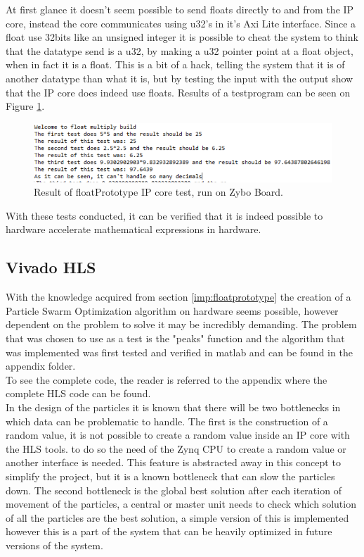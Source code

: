 At first glance it doesn't seem possible to send floats directly to and from the IP core, instead the core communicates using u32's in it's Axi Lite interface. Since a float use 32bits like an unsigned integer it is possible to cheat the system to think that the datatype send is a u32, by making a u32 pointer point at a float object, when in fact it is a float. This is a bit of a hack, telling the system that it is of another datatype than what it is, but by testing the input with the output show that the IP core does indeed use floats. Results of a testprogram can be seen on Figure \ref{fig:floatmultiply}.\\

\begin{figure}[H]
	\centering
	\includegraphics[trim={0 2 0 0},clip,width=0.8\linewidth]{diagram/floatMultiply}
	\caption{Result of floatPrototype IP core test, run on Zybo Board.}
	\label{fig:floatmultiply}
\end{figure}


With these tests conducted, it can be verified that it is indeed possible to hardware accelerate mathematical expressions in hardware.

\subsection{Vivado HLS}
With the knowledge acquired from section \ref{imp:floatprototype}  the creation of a Particle Swarm Optimization algorithm on hardware seems possible, however dependent on the problem to solve it may be incredibly demanding. The problem that was chosen to use as a test is the "peaks" function and the algorithm that was implemented was first tested and verified in matlab and can be found in the appendix folder.\\ %

To see the complete code, the reader is referred to the appendix where the complete HLS code can be found.\\ %

In the design of the particles it is known that there will be two bottlenecks in which data can be problematic to handle. The first is the construction of a random value, it is not possible to create a random value inside an IP core with the HLS tools. to do so the need of the Zynq CPU to create a random value or another interface is needed. This feature is abstracted away in this concept to simplify the project, but it is a known bottleneck that can slow the particles down. The second bottleneck is the global best solution after each iteration of movement of the particles, a central or master unit needs to check which solution of all the particles are the best solution, a simple version of this is implemented however this is a part of the system that can be heavily optimized in future versions of the system.\\


